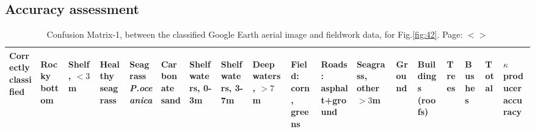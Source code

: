 \documentclass[11pt]{article}
\begin{document}
\begin{appendices}
\subsection{Accuracy assessment}

\begin{table}[H]\footnotesize\label{page-liii}
	\caption{Confusion Matrix-1, between the classified Google Earth aerial image and fieldwork data, for Fig.\ref{fig:42}. Page: $<$\pageref{page-50acc}$>$}\label{tab:kappa-1}
	\centering
	 \begin{tabular}{| p{1.7cm} | p{0.4cm}| p{0.4cm}|p{0.4cm}|p{0.4cm}|p{0.4cm}|p{0.4cm}|p{0.4cm}|p{0.4cm}|p{0.4cm}|p{0.4cm}|p{0.4cm}|p{0.4cm}|p{0.4cm}| p{0.4cm}| p{0.4cm}|| p{0.4cm}| p{0.4cm}|}
	    \hline
		     \textbf{Correctly classified} & \begin{sideways}\textbf{Rocky bottom}\end{sideways} &  \begin{sideways}\textbf{Shelf, $<3$m}\end{sideways} &  \begin{sideways}\textbf{Healthy seagrass}\end{sideways} &  \begin{sideways}\textbf{Seagrass \textit{P.oceanica}}\end{sideways} &  \begin{sideways}\textbf{Carbonate sand}\end{sideways} &  \begin{sideways}\textbf{Shelf waters, 0-3m}\end{sideways} &  \begin{sideways}\textbf{Shelf waters, 3-7m}\end{sideways} & \begin{sideways}\textbf{Deep waters, $>7$m}\end{sideways} &  \begin{sideways}\textbf{Field: corn, greens}\end{sideways} & \begin{sideways}\textbf{Roads: asphalt+ground}\end{sideways} & \begin{sideways}\textbf{Seagrass, other$>3$m}\end{sideways} & \begin{sideways}\textbf{Ground}\end{sideways}& \begin{sideways}\textbf{Buildings (roofs)}\end{sideways} &\begin{sideways}\textbf{Trees}\end{sideways} & \begin{sideways}\textbf{Bushes}\end{sideways} & \begin{sideways}\textbf{Total}\end{sideways}& \begin{sideways}\textbf{$\kappa$ producer accuracy}\end{sideways} \\ \hline \hline

\end{tabular}
\end{table}
\end{appendices}
\end{document}
